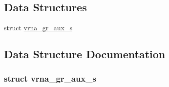 \subsection*{Data Structures}
\begin{DoxyCompactItemize}
\item 
struct \hyperlink{group__grammar_structvrna__gr__aux__s}{vrna\+\_\+gr\+\_\+aux\+\_\+s}
\end{DoxyCompactItemize}


\subsection{Data Structure Documentation}
\label{structvrna__gr__aux__s}
\subsubsection{struct vrna\+\_\+gr\+\_\+aux\+\_\+s}
